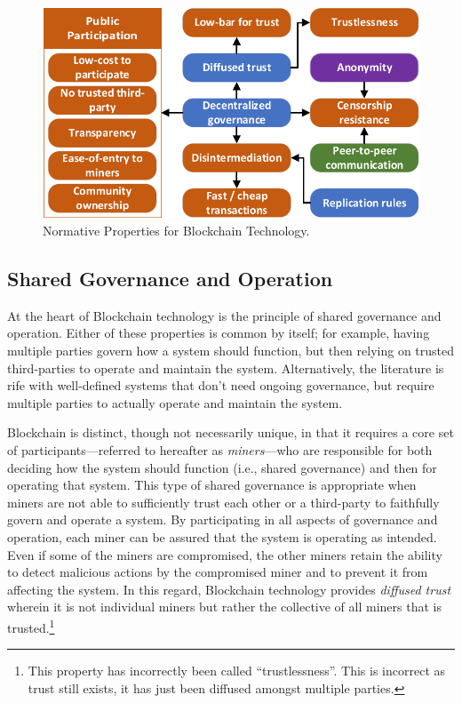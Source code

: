 \begin{figure}
	\centering
	\includegraphics[width=\columnwidth]{figures/normative-properties}	
	\caption{Normative Properties for Blockchain Technology.}
	\label{fig:normative-properties}
\end{figure}

\subsection{Shared Governance and Operation}
At the heart of Blockchain technology is the principle of shared governance and operation.
Either of these properties is common by itself; for example, having multiple parties govern how a system should function, but then relying on trusted third-parties to operate and maintain the system.
Alternatively, the literature is rife with well-defined systems that don't need ongoing governance, but require multiple parties to actually operate and maintain the system.

Blockchain is distinct, though not necessarily unique, in that it requires a core set of participants---referred to hereafter as \emph{miners}---who are responsible for both deciding how the system should function (i.e., shared governance) and then for operating that system.
This type of shared governance is appropriate when miners are not able to sufficiently trust each other or a third-party to faithfully govern and operate a system.
By participating in all aspects of governance and operation, each miner can be assured that the system is operating as intended.
Even if some of the miners are compromised, the other miners retain the ability to detect malicious actions by the compromised miner and to prevent it from affecting the system.
In this regard, Blockchain technology provides \emph{diffused trust} wherein it is not individual miners but rather the collective of all miners that is trusted.\footnote{This property has incorrectly been called ``trustlessness''. This is incorrect as trust still exists, it has just been diffused amongst multiple parties.} 

